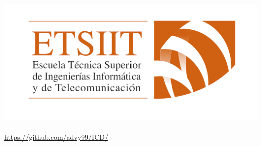 \documentclass[12pt, spanish]{article}
\begin{document}
\begin{titlepage}
	 \includegraphics[scale = 0.20]{logo_etsiit.png}\\[0.3 cm]
    {\large \thedate}\\[0.75cm]
	 \url{https://github.com/advy99/ICD/}\\[0.75cm]
    \doclicenseThis
\end{titlepage}



\pagestyle{fancy}




\tableofcontents
\pagebreak










\end{document}
